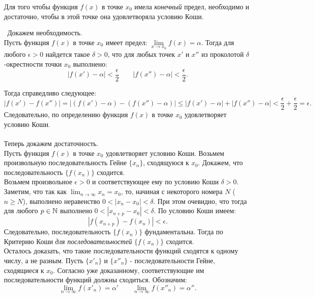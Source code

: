 \begin{theorem}
Для того чтобы функция \(f(x)\) в точке \(x_{0}\) имела \textit{конечный} предел,
необходимо и достаточно, чтобы в этой точке она удовлетворяла условию Коши.

\vspace{3mm}

\proofname~Докажем необходимость. \\
Пусть функция \(f(x)\) в точке \(x_{0}\) имеет предел:
\(\lim\limits_{x\to x_{0}} f(x) = \alpha\). Тогда для любого \(\epsilon > 0\) найдется
такое \(\delta > 0\), что для любых точек \(x'\) и \(x''\) из проколотой \(\delta\)-окрестности
точки \(x_{0}\) выполнено:
\[
|f(x') - \alpha| < \frac{\epsilon}{2} \qquad |f(x'') - \alpha| < \frac{\epsilon}{2}.
\]

Тогда справедливо следующее:
\[
|f(x') - f(x'')| = |(f(x') - \alpha) - (f(x'') - \alpha)| \leq
|f(x') - \alpha| + |f(x'') - \alpha| < \frac{\epsilon}{2} + \frac{\epsilon}{2} = \epsilon.
\]
Следовательно, по определению функция \(f(x)\) в точке \(x_{0}\) удовлетворяет условию Коши.\\
\\
Теперь докажем достаточность.\\
Пусть функция \(f(x)\) в точке \(x_{0}\) удовлетворяет условию Коши.
Возьмем произвольную последовательность Гейне \(\{x_{n}\}\), сходящуюся к \(x_{0}\).
Докажем, что последовательность \(\{f(x_{n})\}\) сходится.\\
Возьмем произвольное \(\epsilon > 0\) и соответствующее ему по условию Коши \(\delta > 0\).
Заметим, что так как \(\lim_{ n \to \infty } x_{n} = x_{0}\), то, начиная с некоторого номера
\(N\) (\(n \geq N\)), выполнено неравенство \(0 < |x_{n} - x_{0}| < \delta\).
При этом очевидно, что тогда для любого \(p \in \mathbb{N}\) выполнено
\(0 < |x_{n+p} - x_{0}| < \delta\). По условию Коши имеем:
\[
|f(x_{n+p}) - f(x_{n})| < \epsilon.
\]
Следовательно, последовательность \(\{f(x_{n})\}\) фундаментальна.
Тогда по Критерию Коши \textit{для последовательностей} \(\{f(x_{n})\}\) сходится.\\

Осталось доказать, что такие последовательности функций сходятся к одному числу,
а не разным.
Пусть \(\{x'_{n}\}\) и \(\{x''_{n}\}\) - последовательности Гейне, сходящиеся
к \(x_{0}\). Согласно уже доказанному, соответствующие им последовательности функций
должны сходиться. Обозначим:
\[
\lim_{ n \to \infty } f(x'_{n}) = \alpha' \qquad \lim_{ n \to \infty } f(x''_{n}) = \alpha''.
\]


\end{theorem}
